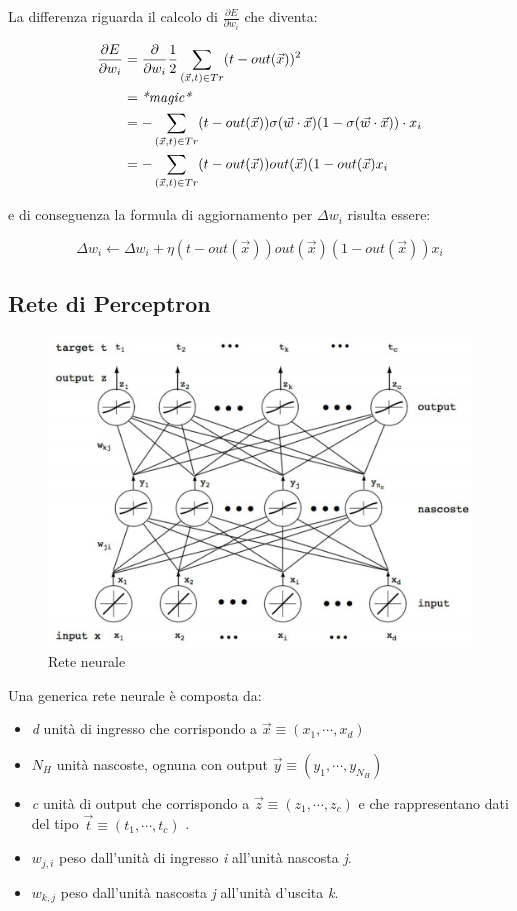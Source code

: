 La differenza riguarda il calcolo di $\frac{\partial E}{\partial w_i}$ che diventa:

\begin{align*}
\frac{\partial E}{\partial w_i} &= \frac{\partial}{\partial w_i} \frac{1}{2} \sum_{(\vec{x},t) \in Tr} (t - out(\vec{x}))^2 \\
	&= \text{\textit{*magic*}} \\
	&= - \sum_{(\vec{x},t) \in Tr} (t - out(\vec{x})) \sigma(\vec{w} \cdot \vec{x})(1-\sigma(\vec{w} \cdot \vec{x}))\cdot x_i \\
	&= - \sum_{(\vec{x},t) \in Tr} (t - out(\vec{x})) out(\vec{x})  (1-out(\vec{x}) x_i \\
\end{align*}

e di conseguenza la formula di aggiornamento per $\Delta w_i$ risulta essere:

$$
\Delta w_i \leftarrow \Delta w_i + \eta (t - out(\vec{x})) out(\vec{x})  (1-out(\vec{x})) x_i
$$
\subsection{Rete di Perceptron}\label{rete-di-perceptron}

\begin{figure}[htbp]
\centering
\includegraphics[width=\textwidth]{./notes/immagini/l10-rete.png}
\caption{Rete neurale}
\end{figure}

Una generica rete neurale è composta da:

\begin{itemize}
\item \textit{d} unità di ingresso che corrispondo a $\vec{x} \equiv (x_1, \cdots, x_d)$
\item $N_H$ unità nascoste, ognuna con output $\vec{y} \equiv (y_1, \cdots, y_{N_H})$
\item \textit{c} unità di output che corrispondo a $\vec{z} \equiv (z_1, \cdots, z_c)$ e che rappresentano dati del tipo $\vec{t} \equiv (t_1, \cdots, t_c)$ .
\item $w_{j,i}$ peso dall'unità di ingresso \textit{i} all'unità nascosta \textit{j}.
\item $w_{k,j}$ peso dall'unità nascosta \textit{j} all'unità d'uscita \textit{k}.
\end{itemize}

